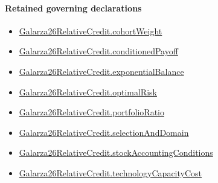 \documentclass[10pt]{article}
\begin{document}
\paragraph{Retained governing declarations}
\begin{itemize}\raggedright
\item \hyperlink{paper-prerequisite-b0571b2c4a78eab5}{Galarza26\allowbreak{}Relative\allowbreak{}Credit.\allowbreak{}cohort\allowbreak{}Weight}
\item \hyperlink{paper-prerequisite-0bf7e0c122a51179}{Galarza26\allowbreak{}Relative\allowbreak{}Credit.\allowbreak{}conditioned\allowbreak{}Payoff}
\item \hyperlink{governing-declaration-ac78c6a99f925061}{Galarza26\allowbreak{}Relative\allowbreak{}Credit.\allowbreak{}exponential\allowbreak{}Balance}
\item \hyperlink{governing-declaration-e139cf967ddac229}{Galarza26\allowbreak{}Relative\allowbreak{}Credit.\allowbreak{}optimal\allowbreak{}Risk}
\item \hyperlink{governing-declaration-c80cb553f94a2c2b}{Galarza26\allowbreak{}Relative\allowbreak{}Credit.\allowbreak{}portfolio\allowbreak{}Ratio}
\item \hyperlink{paper-prerequisite-ab0e2f9b84884bc6}{Galarza26\allowbreak{}Relative\allowbreak{}Credit.\allowbreak{}selection\allowbreak{}And\allowbreak{}Domain}
\item \hyperlink{paper-prerequisite-de4cba6057d51d83}{Galarza26\allowbreak{}Relative\allowbreak{}Credit.\allowbreak{}stock\allowbreak{}Accounting\allowbreak{}Conditions}
\item \hyperlink{paper-prerequisite-e5f9b7ce782f743a}{Galarza26\allowbreak{}Relative\allowbreak{}Credit.\allowbreak{}technology\allowbreak{}Capacity\allowbreak{}Cost}
\end{itemize}
\end{document}
